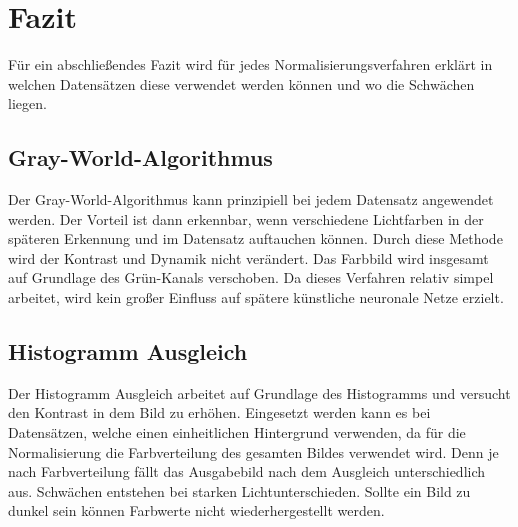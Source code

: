 \chapter{Fazit}\label{s.fazit}
Für ein abschließendes Fazit wird für jedes Normalisierungsverfahren erklärt in welchen Datensätzen diese verwendet werden können und wo die Schwächen liegen.
\section{Gray-World-Algorithmus}
Der Gray-World-Algorithmus kann prinzipiell bei jedem Datensatz angewendet werden. Der Vorteil ist dann erkennbar, wenn verschiedene Lichtfarben in der späteren Erkennung und im Datensatz auftauchen können. Durch diese Methode wird der Kontrast und Dynamik nicht verändert. Das Farbbild wird insgesamt auf Grundlage des Grün-Kanals verschoben. Da dieses Verfahren relativ simpel arbeitet, wird kein großer Einfluss auf spätere künstliche neuronale Netze erzielt.
\section{Histogramm Ausgleich}
Der Histogramm Ausgleich arbeitet auf Grundlage des Histogramms und versucht den Kontrast in dem Bild zu erhöhen. Eingesetzt werden kann es bei Datensätzen, welche einen einheitlichen Hintergrund verwenden, da für die Normalisierung die Farbverteilung des gesamten Bildes verwendet wird. Denn je nach Farbverteilung fällt das Ausgabebild nach dem Ausgleich unterschiedlich aus. Schwächen entstehen bei starken Lichtunterschieden. Sollte ein Bild zu dunkel sein können Farbwerte nicht wiederhergestellt werden.
